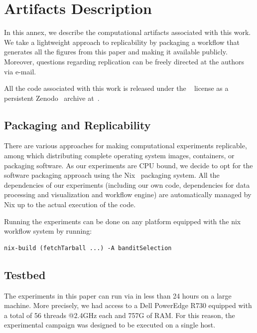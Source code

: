 \documentclass[sigconf]{acmart}
\begin{document}



\clearpage
\section*{Artifacts Description}

In this annex, we describe the computational artifacts associated with this
work. We take a lightweight approach to replicability by packaging a workflow
that generates all the figures from this paper and making it available
publicly. Moreover, questions regarding replication can be freely directed at
the authors via e-mail.

All the code associated with this work is released under the ~\cite{ISC}
license as a persistent Zenodo~\cite{zenodo} archive at~\cite{zenodomain}.

\subsection{Packaging and Replicability}

There are various approaches for making computational experiments replicable,
among which distributing complete operating system images, containers, or
packaging software. As our experiments are CPU bound, we decide to opt for the
software packaging approach using the Nix~\cite{nix} packaging system.  All the
dependencies of our experiments (including our own code, dependencies for data
processing and visualization and workflow engine) are automatically managed by
Nix up to the actual execution of the code.

Running the experiments can be done on any platform equipped with the nix
workflow system by running:

\begin{lstlisting}
nix-build (fetchTarball ...) -A banditSelection
\end{lstlisting}

\subsection{Testbed}

 The experiments in this paper can run via in less than 24 hours on a large
 machine. More precisely, we had access to a Dell PowerEdge R730 equipped with
 a total of 56 threads @2.4GHz each and 757G of RAM.  For this reason, the
 experimental campaign was designed to be executed on a single host.
\end{document}
